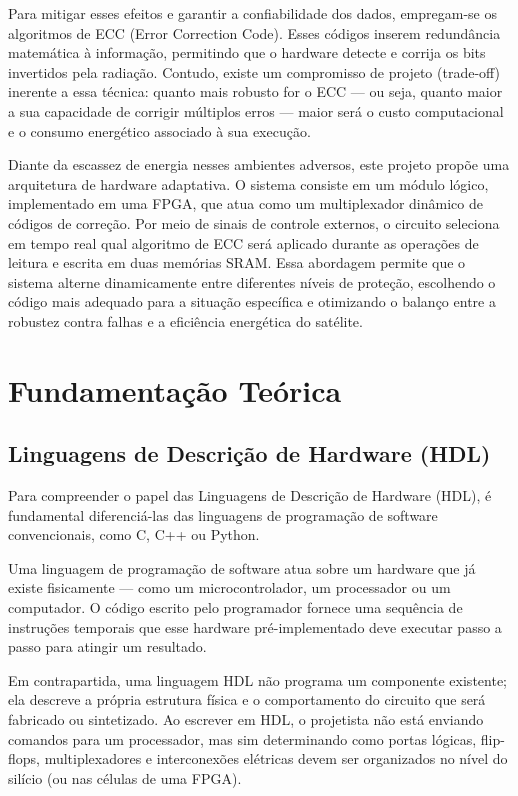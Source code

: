 \documentclass[12pt,a4paper]{article}
\begin{document}
Para mitigar esses efeitos e garantir a confiabilidade dos dados, empregam-se os algoritmos de ECC (Error Correction Code). Esses códigos inserem redundância matemática à informação, permitindo que o hardware detecte e corrija os bits invertidos pela radiação. Contudo, existe um compromisso de projeto (trade-off) inerente a essa técnica: quanto mais robusto for o ECC — ou seja, quanto maior a sua capacidade de corrigir múltiplos erros — maior será o custo computacional e o consumo energético associado à sua execução.

Diante da escassez de energia nesses ambientes adversos, este projeto propõe uma arquitetura de hardware adaptativa. O sistema consiste em um módulo lógico, implementado em uma FPGA, que atua como um multiplexador dinâmico de códigos de correção. Por meio de sinais de controle externos, o circuito seleciona em tempo real qual algoritmo de ECC será aplicado durante as operações de leitura e escrita em duas memórias SRAM. Essa abordagem permite que o sistema alterne dinamicamente entre diferentes níveis de proteção, escolhendo o código mais adequado para a situação específica e otimizando o balanço entre a robustez contra falhas e a eficiência energética do satélite.

\newpage
\section{Fundamentação Teórica}
\label{sec:fundamentacao_teorica}

\subsection{Linguagens de Descrição de Hardware (HDL)}
Para compreender o papel das Linguagens de Descrição de Hardware (HDL), é fundamental diferenciá-las das linguagens de programação de software convencionais, como C, C++ ou Python.

Uma linguagem de programação de software atua sobre um hardware que já existe fisicamente — como um microcontrolador, um processador ou um computador. O código escrito pelo programador fornece uma sequência de instruções temporais que esse hardware pré-implementado deve executar passo a passo para atingir um resultado.

Em contrapartida, uma linguagem HDL não programa um componente existente; ela descreve a própria estrutura física e o comportamento do circuito que será fabricado ou sintetizado. Ao escrever em HDL, o projetista não está enviando comandos para um processador, mas sim determinando como portas lógicas, flip-flops, multiplexadores e interconexões elétricas devem ser organizados no nível do silício (ou nas células de uma FPGA).
\end{document}

